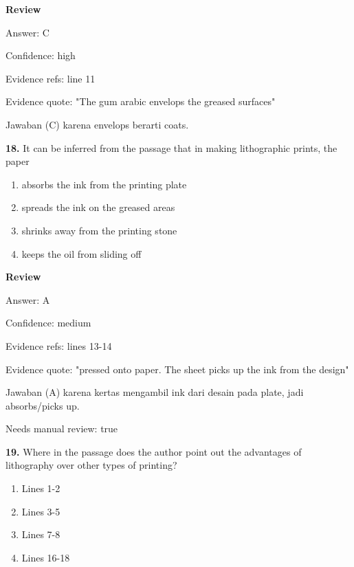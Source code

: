 \documentclass[12pt]{article}
\begin{document}
\par
\begingroup
\setlength{\parskip}{0pt}
\setlength{\parindent}{0pt}
\textbf{Review}\par
Answer: C\par
Confidence: high\par
Evidence refs: line 11\par
Evidence quote: "The gum arabic envelops the greased surfaces"\par
Jawaban (C) karena envelops berarti coats.\par
\endgroup
\par
\vspace{0.25\baselineskip}
\noindent\textbf{18.} It can be inferred from the passage that in making lithographic prints, the paper
\begin{enumerate}[label=(\Alph*),leftmargin=*,itemsep=0.2em]
\item absorbs the ink from the printing plate
\item spreads the ink on the greased areas
\item shrinks away from the printing stone
\item keeps the oil from sliding off
\end{enumerate}
\par
\begingroup
\setlength{\parskip}{0pt}
\setlength{\parindent}{0pt}
\textbf{Review}\par
Answer: A\par
Confidence: medium\par
Evidence refs: lines 13-14\par
Evidence quote: "pressed onto paper. The sheet picks up the ink from the design"\par
Jawaban (A) karena kertas mengambil ink dari desain pada plate, jadi absorbs/picks up.\par
Needs manual review: true\par
\endgroup
\par
\vspace{0.25\baselineskip}
\noindent\textbf{19.} Where in the passage does the author point out the advantages of lithography over other types of printing?
\begin{enumerate}[label=(\Alph*),leftmargin=*,itemsep=0.2em]
\item Lines 1-2
\item Lines 3-5
\item Lines 7-8
\item Lines 16-18
\end{enumerate}
\par
\end{document}
